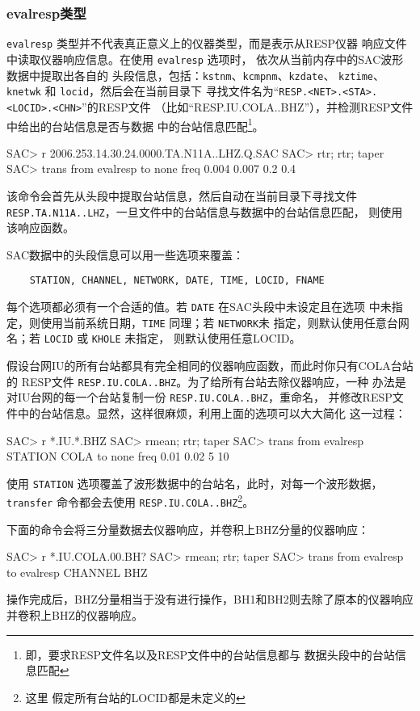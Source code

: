\subsubsection{evalresp类型}
\texttt{evalresp} 类型并不代表真正意义上的仪器类型，而是表示从RESP仪器
响应文件中读取仪器响应信息。在使用 \texttt{evalresp} 选项时，
 依次从当前内存中的SAC波形数据中提取出各自的
头段信息，包括：\texttt{kstnm}、\texttt{kcmpnm}、\texttt{kzdate}、
\texttt{kztime}、\texttt{knetwk} 和 \texttt{locid}，然后会在当前目录下
寻找文件名为``\texttt{RESP.<NET>.<STA>.<LOCID>.<CHN>}''的RESP文件
（比如``RESP.IU.COLA..BHZ''），并检测RESP文件中给出的台站信息是否与数据
中的台站信息匹配\footnote{即，要求RESP文件名以及RESP文件中的台站信息都与
数据头段中的台站信息匹配}。
\begin{SACCode}
SAC> r 2006.253.14.30.24.0000.TA.N11A..LHZ.Q.SAC
SAC> rtr; rtr; taper
SAC> trans from evalresp to none freq 0.004 0.007 0.2 0.4
\end{SACCode}
该命令会首先从头段中提取台站信息，然后自动在当前目录下寻找文件
\texttt{RESP.TA.N11A..LHZ}，一旦文件中的台站信息与数据中的台站信息匹配，
则使用该响应函数。

SAC数据中的头段信息可以用一些选项来覆盖：
\begin{verbatim}
    STATION, CHANNEL, NETWORK, DATE, TIME, LOCID, FNAME
\end{verbatim}
每个选项都必须有一个合适的值。若 \texttt{DATE} 在SAC头段中未设定且在选项
中未指定，则使用当前系统日期，\texttt{TIME} 同理；若 \texttt{NETWORK}未
指定，则默认使用任意台网名；若 \texttt{LOCID} 或 \texttt{KHOLE} 未指定，
则默认使用任意LOCID。

假设台网IU的所有台站都具有完全相同的仪器响应函数，而此时你只有COLA台站的
RESP文件 \texttt{RESP.IU.COLA..BHZ}。为了给所有台站去除仪器响应，一种
办法是对IU台网的每一个台站复制一份 \texttt{RESP.IU.COLA..BHZ}，重命名，
并修改RESP文件中的台站信息。显然，这样很麻烦，利用上面的选项可以大大简化
这一过程：
\begin{SACCode}
SAC> r *.IU.*.BHZ
SAC> rmean; rtr; taper
SAC> trans from evalresp STATION COLA to none freq 0.01 0.02 5 10
\end{SACCode}
使用 \texttt{STATION} 选项覆盖了波形数据中的台站名，此时，对每一个波形数据，
\texttt{transfer} 命令都会去使用 \texttt{RESP.IU.COLA..BHZ}\footnote{这里
假定所有台站的LOCID都是未定义的}。

下面的命令会将三分量数据去仪器响应，并卷积上BHZ分量的仪器响应：
\begin{SACCode}
SAC> r *.IU.COLA.00.BH?
SAC> rmean; rtr; taper
SAC> trans from evalresp to evalresp CHANNEL BHZ
\end{SACCode}
操作完成后，BHZ分量相当于没有进行操作，BH1和BH2则去除了原本的仪器响应
并卷积上BHZ的仪器响应。

